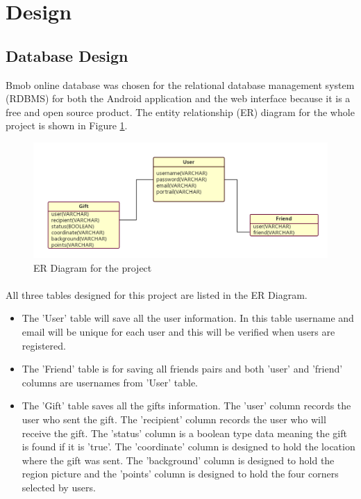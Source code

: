 \section{Design}
\label{sec:Design}

\subsection{Database Design} 
Bmob online database was chosen for the relational database management system (RDBMS) for both the Android application and the web interface because it is a free and open source product. The entity relationship (ER) diagram for the whole project is shown in Figure \ref{ERDiagram}.

\begin{figure}[htb]
\centering
\includegraphics[width=.5\textwidth]{section03/assets/ERDiagram.png}
\caption[Short Caption 2]{\label{ERDiagram}ER Diagram for the project}
\end{figure}

\paragraph{}
All three tables designed for this project are listed in the ER Diagram.
\begin{itemize}
\item The 'User' table will save all the user information. In this table username and email will be unique for each user and this will be verified when users are registered.
\item The 'Friend' table is for saving all friends pairs and both 'user' and 'friend' columns are usernames from 'User' table.
\item The 'Gift' table saves all the gifts information. The 'user' column records the user who sent the gift. The 'recipient' column records the user who will receive the gift. The 'status' column is a boolean type data meaning the gift is found if it is 'true'. The 'coordinate' column is designed to hold the location where the gift was sent. The 'background' column is designed to hold the region picture and the 'points' column is designed to hold the four corners selected by users.
\end{itemize}

